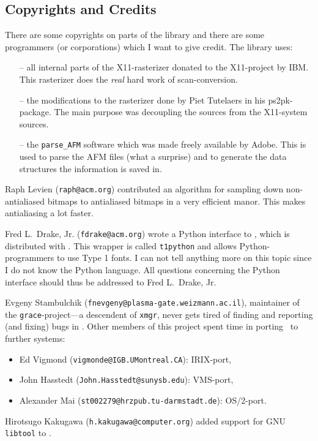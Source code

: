 \subsection{Copyrights and Credits}
There are some copyrights on parts of the library and there are some
programmers (or corporations) which I want to give credit. 
The library uses:
\begin{itemize}
\item[--] all internal parts of the X11-rasterizer donated to
  the X11-project by IBM. This rasterizer does the {\em real} hard
  work of scan-conversion.
\item[--] the modifications to the rasterizer done by Piet
  Tutelaers in his ps2pk-package. The main purpose was decoupling the 
  sources from the X11-system sources.
\item[--] the \verb+parse_AFM+ software which was made freely available
  by Adobe. This is used to parse the AFM files (what
  a surprise) and to generate the data structures the information is
  saved in.
\end{itemize}

Raph Levien (\verb+raph@acm.org+) contributed an algorithm for 
sampling down non-antialiased bitmaps to antialiased bitmaps in a very
efficient manor. This makes antialiasing a lot faster.

Fred L.\ Drake, Jr. (\verb+fdrake@acm.org+) wrote a Python interface to
\tonelib, which is distributed with \tonelib. This wrapper is called
\verb+t1python+ and allows Python-programmers to use Type 1 fonts. I
can not tell anything more on this topic since I do not know the
Python language. All questions concerning the Python interface should
thus be addressed to Fred L.\ Drake, Jr.

Evgeny Stambulchik (\verb+fnevgeny@plasma-gate.weizmann.ac.il+), maintainer of
the \verb+grace+-project---a descendent of \verb+xmgr+, never gets tired of
finding and reporting (and fixing) bugs in \tonelib. Other members of this
project spent time in porting \tonelib\ to further systems:
\begin{itemize}
\item Ed Vigmond (\verb+vigmonde@IGB.UMontreal.CA+): IRIX-port,
\item John Hasstedt (\verb+John.Hasstedt@sunysb.edu+): VMS-port,
\item Alexander Mai (\verb+st002279@hrzpub.tu-darmstadt.de+): OS/2-port.
\end{itemize}

Hirotsugo Kakugawa (\verb+h.kakugawa@computer.org+) added support for GNU
\verb+libtool+ to \tonelib.

